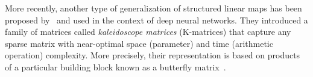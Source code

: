 \drawstar

More recently, another type of generalization of structured linear maps has been proposed by~\citet{dao2020kaleidoscope} and used in the context of deep neural networks.
They introduced a family of matrices called \emph{kaleidoscope matrices} (K-matrices) that capture any sparse matrix with near-optimal space (parameter) and time (arithmetic operation) complexity.
More precisely, their representation is based on products of a particular building block known as a butterfly matrix~\cite{parker1995random,dao2019learning}.






%







